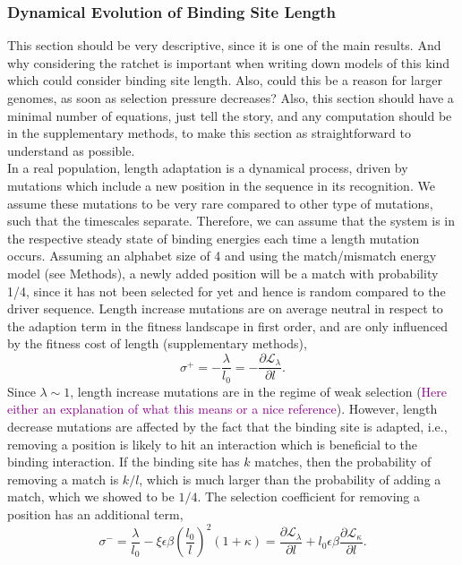 \documentclass[10pt,a4paper]{article}
\newcommand{\purple}[1]{\textcolor{purple}{#1}}
\begin{document}
\subsubsection*{Dynamical Evolution of Binding Site Length}
{\color{ForestGreen} This section should be very descriptive, since it is one of the main results. And why considering the ratchet is important when writing down models of this kind which could consider binding site length. Also, could this be a reason for larger genomes, as soon as selection pressure decreases? Also, this section should have a minimal number of equations, just tell the story, and any computation should be in the supplementary methods, to make this section as straightforward to understand as possible. }\\
In a real population, length adaptation is a dynamical process, driven by mutations which include a new position in the sequence in its recognition. We assume these mutations to be very rare compared to other type of mutations, such that the timescales separate. Therefore, we can assume that the system is in the respective steady state of binding energies each time a length mutation occurs. Assuming an alphabet size of 4 and using the match/mismatch energy model (see Methods), a newly added position will be a match with probability 1/4, since it has not been selected for yet and hence is random compared to the driver sequence. Length increase mutations are on average neutral in respect to the adaption term in the fitness landscape in first order, and are only influenced by the fitness cost of length (supplementary methods),
\begin{equation}
	\sigma^+ = -\frac{\lambda}{l_0} =-\frac{\partial \mathcal{L}_\lambda}{\partial l}.
\end{equation}
Since $\lambda\sim 1$, length increase mutations are in the regime of weak selection (\purple{Here either an explanation of what this means or a nice reference}).
However, length decrease mutations are affected by the fact that the binding site is adapted, i.e., removing a position is likely to hit an interaction which is beneficial to the binding interaction. If the binding site has $k$ matches, then the probability of removing a match is $k/l$, which is much larger than the probability of adding a match, which we showed to be $1/4$. The selection coefficient for removing a position has an additional term,
\begin{equation}
	\sigma^- = \frac{\lambda}{l_0} - \xi \epsilon\beta \left(\frac{l_0}{l}\right)^2 (1+\kappa) = \frac{\partial \mathcal{L}_\lambda}{\partial l} + l_0 \epsilon\beta\frac{\partial \mathcal{L_\kappa}}{\partial l}.
\end{equation}
\end{document}
